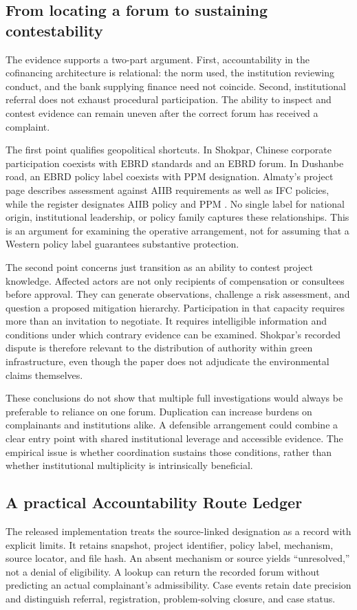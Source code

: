 \documentclass[11pt,a4paper]{article}
\begin{document}
\subsection{From locating a forum to sustaining contestability}
The evidence supports a two-part argument. First, accountability in the cofinancing architecture is relational: the norm used, the institution reviewing conduct, and the bank supplying finance need not coincide. Second, institutional referral does not exhaust procedural participation. The ability to inspect and contest evidence can remain uneven after the correct forum has received a complaint.

The first point qualifies geopolitical shortcuts. In Shokpar, Chinese corporate participation coexists with EBRD standards and an EBRD forum. In Dushanbe road, an EBRD policy label coexists with PPM designation. Almaty's project page describes assessment against AIIB requirements as well as IFC policies, while the register designates AIIB policy and PPM \citep{almaty}. No single label for national origin, institutional leadership, or policy family captures these relationships. This is an argument for examining the operative arrangement, not for assuming that a Western policy label guarantees substantive protection.

The second point concerns just transition as an ability to contest project knowledge. Affected actors are not only recipients of compensation or consultees before approval. They can generate observations, challenge a risk assessment, and question a proposed mitigation hierarchy. Participation in that capacity requires more than an invitation to negotiate. It requires intelligible information and conditions under which contrary evidence can be examined. Shokpar's recorded dispute is therefore relevant to the distribution of authority within green infrastructure, even though the paper does not adjudicate the environmental claims themselves.

These conclusions do not show that multiple full investigations would always be preferable to reliance on one forum. Duplication can increase burdens on complainants and institutions alike. A defensible arrangement could combine a clear entry point with shared institutional leverage and accessible evidence. The empirical issue is whether coordination sustains those conditions, rather than whether institutional multiplicity is intrinsically beneficial.

\subsection{A practical Accountability Route Ledger}
The released implementation treats the source-linked designation as a record with explicit limits. It retains snapshot, project identifier, policy label, mechanism, source locator, and file hash. An absent mechanism or source yields ``unresolved,'' not a denial of eligibility. A lookup can return the recorded forum without predicting an actual complainant's admissibility. Case events retain date precision and distinguish referral, registration, problem-solving closure, and case status.
\end{document}
